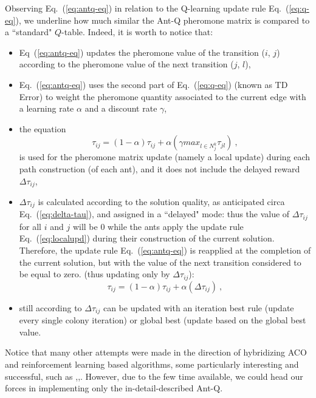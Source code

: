 \documentclass[10pt]{article}
\begin{document}
Observing Eq.~(\ref{eq:antq-eq}) in relation to the Q-learning update rule Eq.~(\ref{eq:q-eq}), we underline how much similar the Ant-Q pheromone matrix is compared to a ``standard" $Q$-table. Indeed, it is worth to notice that:
\begin{itemize}
\item  Eq~(\ref{eq:antq-eq})  updates the pheromone  value  of  the  transition  ($i$, $j$)  according to the  pheromone  value  of  the  next transition  ($j$, $ l$),
\item Eq.~(\ref{eq:antq-eq}) uses  the second part of Eq.~(\ref{eq:q-eq}) (known as TD Error) to  weight the  pheromone  quantity associated  to  the current  edge  with  a learning  rate $\alpha$  and  a discount  rate $\gamma$, 
\item the equation 
\begin{equation}
\tau_{ij}= (1-\alpha) \tau_{ij} + \alpha(\gamma max_{l\in N^k_j}\tau_{jl}) ~,
\label{eq:localupd}
\end{equation}
is used for the pheromone matrix update (namely a local update) during each path construction (of each ant), and it does not include the delayed reward $\Delta \tau_{ij}$,
\item $\Delta \tau_{ij}$ is calculated according to the solution quality, as anticipated circa Eq.~(\ref{eq:delta-tau}), and assigned in a ``delayed" mode: thus the value of $\Delta \tau_{ij}$  for all $i$ and $j$ will be $0$ while the ants  apply  the  update  rule Eq.~(\ref{eq:localupd})  during  their  construction  of the  current solution. 
Therefore, the update rule Eq.~(\ref{eq:antq-eq}) is reapplied at the completion of the current solution, but with the value of the next transition considered to be equal to zero. (thus updating only by $\Delta \tau_{ij}$):
\begin{equation}
\tau_{ij}= (1-\alpha) \tau_{ij} + \alpha(\Delta\tau_{ij}) ~,
\label{eq:antq-delay}
\end{equation}

\item still according to \cite{undici} \cite{diciotto} $\Delta \tau_{ij}$ can be updated with an iteration  best  rule (update every single colony iteration) or  global  best (update based on the global best value.
\end{itemize}

Notice that many other attempts were made in the direction of hybridizing ACO and reinforcement learning based algorithms, some particularly interesting and successful, such as \cite{sedici},\cite{quattordici},\cite{quindici}. However, due to the few time available, we could head our forces in implementing only the in-detail-described Ant-Q.
\end{document}
